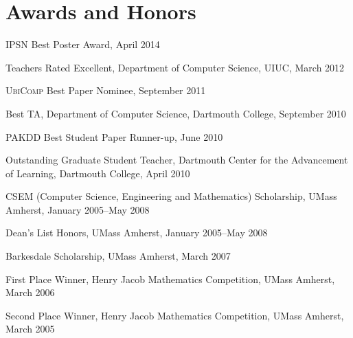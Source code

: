 \section{\sc Awards and Honors}

\textsc{IPSN} Best Poster Award, April 2014
\vspace*{-2.5mm}

Teachers Rated Excellent, Department of Computer Science, UIUC, March 2012
\vspace*{-2.5mm}

\textsc{UbiComp} Best Paper Nominee, September 2011
\vspace*{-2.5mm}

Best TA, Department of Computer Science, Dartmouth College, September 2010
\vspace*{-2.5mm}

\textsc{PAKDD} Best Student Paper Runner-up, June 2010
\vspace*{-2.5mm}

Outstanding Graduate Student Teacher, Dartmouth
Center for the Advancement of Learning, Dartmouth College, April 2010
\vspace*{-2.5mm}

CSEM (Computer Science, Engineering and Mathematics) Scholarship,
UMass Amherst, January 2005--May 2008
\vspace*{-2.5mm}

Dean's List Honors, UMass Amherst, January 2005--May 2008
\vspace*{-2.5mm}

Barkesdale Scholarship, UMass Amherst, March 2007
\vspace*{-2.5mm}

First Place Winner, Henry Jacob Mathematics
Competition, UMass Amherst, March 2006
\vspace*{-2.5mm}

Second Place Winner, Henry Jacob Mathematics
Competition, UMass Amherst, March 2005
\vspace*{-2.5mm}
